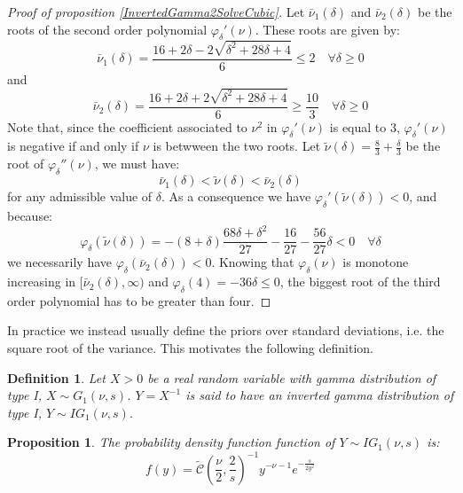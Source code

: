 \documentclass{amsart}
\theoremstyle{plain}
\newtheorem{proposition}{Proposition}[section]
\newtheorem{definition}{Definition}[section]
\theoremstyle{remark}
\numberwithin{equation}{section}
\begin{document}
\begin{proof}[Proof of proposition \ref{InvertedGamma2SolveCubic}]
  Let $\bar\nu_1(\delta)$ and $\bar\nu_2(\delta)$ be the roots of the
  second order polynomial $\varphi_{\delta}'(\nu)$. These roots are
  given by:
  \[
    \bar\nu_1(\delta) = \frac{16+2\delta-2\sqrt{\delta^2+28\delta+4}}{6}\leq 2 \quad \forall \delta\geq 0
  \]
  and
  \[
    \bar\nu_2(\delta) = \frac{16+2\delta+2\sqrt{\delta^2+28\delta+4}}{6}\geq \frac{10}{3} \quad \forall \delta\geq 0
  \]
  Note that, since the coefficient associated to $\nu^2$ in
  $\varphi_{\delta}'(\nu)$ is equal to 3, $\varphi_{\delta}'(\nu)$ is
  negative if and only if $\nu$ is betwween the two roots.  Let
  $\tilde\nu(\delta) = \frac{8}{3}+\frac{\delta}{3}$ be the root of
  $\varphi_{\delta}''(\nu)$, we must have:
  \[
    \bar\nu_1(\delta) < \tilde\nu(\delta) < \bar\nu_2(\delta)
  \]
  for any admissible value of $\delta$. As a consequence we have $\varphi_{\delta}'(\tilde\nu(\delta))<0$, and because:
  \[
    \varphi_{\delta}(\tilde\nu(\delta)) = -(8+\delta)\frac{68\delta+\delta^2}{27}-\frac{16}{27}-\frac{56}{27}\delta <0 \quad \forall \delta
  \]
  we necessarily have $\varphi_{\delta}(\bar\nu_2(\delta))<0$. Knowing
  that $\varphi_{\delta}(\nu)$ is monotone increasing in
  $[\bar\nu_2(\delta), \infty)$ and
  $\varphi_{\delta}(4) = -36\delta \leq 0$, the biggest root of the
  third order polynomial has to be greater than four.
\end{proof}

In practice we instead usually define the priors over standard
deviations, i.e. the square root of the variance. This motivates the
following definition.\newline

\begin{definition}\label{InvertedGamma1}
  Let $X>0$ be a real random variable with gamma distribution of type
  I, $X\sim G_1\left(\nu,s\right)$. $Y = X^{-1}$ is said to have an
  inverted gamma distribution of type I, $Y\sim IG_1(\nu, s)$.
\end{definition}

\begin{proposition}\label{InvertedGamma1Density}
  The probability density function function of $Y\sim IG_1(\nu, s)$ is:
  \[
    f(y) = \widetilde{\mathcal C}\left(\frac{\nu}{2}, \frac{2}{s}\right)^{-1}y^{-\nu-1}e^{-\frac{s}{2 y^2}}
  \]
\end{proposition}
\end{document}

